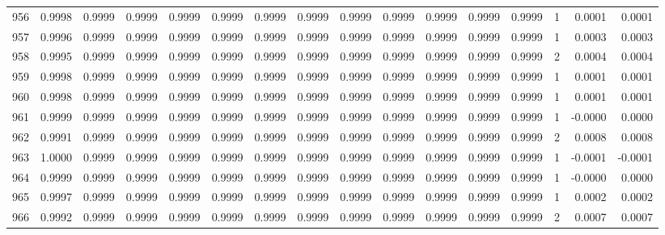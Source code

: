 \begin{tabular}{lrrrrrrrrrrrrrrr}
956 &      0.9998 &  0.9999 &  0.9999 &  0.9999 &  0.9999 &  0.9999 &  0.9999 &  0.9999 &  0.9999 &  0.9999 &   0.9999 &     0.9999 &      1 &                    0.0001 &                     0.0001 \\
957 &      0.9996 &  0.9999 &  0.9999 &  0.9999 &  0.9999 &  0.9999 &  0.9999 &  0.9999 &  0.9999 &  0.9999 &   0.9999 &     0.9999 &      1 &                    0.0003 &                     0.0003 \\
958 &      0.9995 &  0.9999 &  0.9999 &  0.9999 &  0.9999 &  0.9999 &  0.9999 &  0.9999 &  0.9999 &  0.9999 &   0.9999 &     0.9999 &      2 &                    0.0004 &                     0.0004 \\
959 &      0.9998 &  0.9999 &  0.9999 &  0.9999 &  0.9999 &  0.9999 &  0.9999 &  0.9999 &  0.9999 &  0.9999 &   0.9999 &     0.9999 &      1 &                    0.0001 &                     0.0001 \\
960 &      0.9998 &  0.9999 &  0.9999 &  0.9999 &  0.9999 &  0.9999 &  0.9999 &  0.9999 &  0.9999 &  0.9999 &   0.9999 &     0.9999 &      1 &                    0.0001 &                     0.0001 \\
961 &      0.9999 &  0.9999 &  0.9999 &  0.9999 &  0.9999 &  0.9999 &  0.9999 &  0.9999 &  0.9999 &  0.9999 &   0.9999 &     0.9999 &      1 &                   -0.0000 &                     0.0000 \\
962 &      0.9991 &  0.9999 &  0.9999 &  0.9999 &  0.9999 &  0.9999 &  0.9999 &  0.9999 &  0.9999 &  0.9999 &   0.9999 &     0.9999 &      2 &                    0.0008 &                     0.0008 \\
963 &      1.0000 &  0.9999 &  0.9999 &  0.9999 &  0.9999 &  0.9999 &  0.9999 &  0.9999 &  0.9999 &  0.9999 &   0.9999 &     0.9999 &      1 &                   -0.0001 &                    -0.0001 \\
964 &      0.9999 &  0.9999 &  0.9999 &  0.9999 &  0.9999 &  0.9999 &  0.9999 &  0.9999 &  0.9999 &  0.9999 &   0.9999 &     0.9999 &      1 &                   -0.0000 &                     0.0000 \\
965 &      0.9997 &  0.9999 &  0.9999 &  0.9999 &  0.9999 &  0.9999 &  0.9999 &  0.9999 &  0.9999 &  0.9999 &   0.9999 &     0.9999 &      1 &                    0.0002 &                     0.0002 \\
966 &      0.9992 &  0.9999 &  0.9999 &  0.9999 &  0.9999 &  0.9999 &  0.9999 &  0.9999 &  0.9999 &  0.9999 &   0.9999 &     0.9999 &      2 &                    0.0007 &                     0.0007 \\

\end{tabular}
